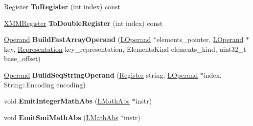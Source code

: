 \begin{DoxyCompactItemize}
\item 
\hyperlink{structv8_1_1internal_1_1_register}{Register} {\bfseries To\+Register} (int index) const \hypertarget{classv8_1_1internal_1_1_l_code_gen_ae4d98c4f4146a2d8ea844342a5bae0ea}{}\label{classv8_1_1internal_1_1_l_code_gen_ae4d98c4f4146a2d8ea844342a5bae0ea}

\item 
\hyperlink{structv8_1_1internal_1_1_double_register}{X\+M\+M\+Register} {\bfseries To\+Double\+Register} (int index) const \hypertarget{classv8_1_1internal_1_1_l_code_gen_a352c288a64a7ad764cd7521780fa6f73}{}\label{classv8_1_1internal_1_1_l_code_gen_a352c288a64a7ad764cd7521780fa6f73}

\item 
\hyperlink{classv8_1_1internal_1_1_operand}{Operand} {\bfseries Build\+Fast\+Array\+Operand} (\hyperlink{classv8_1_1internal_1_1_l_operand}{L\+Operand} $\ast$elements\+\_\+pointer, \hyperlink{classv8_1_1internal_1_1_l_operand}{L\+Operand} $\ast$key, \hyperlink{classv8_1_1internal_1_1_representation}{Representation} key\+\_\+representation, Elements\+Kind elements\+\_\+kind, uint32\+\_\+t base\+\_\+offset)\hypertarget{classv8_1_1internal_1_1_l_code_gen_a96354b52eae3401a603556c6e11b44aa}{}\label{classv8_1_1internal_1_1_l_code_gen_a96354b52eae3401a603556c6e11b44aa}

\item 
\hyperlink{classv8_1_1internal_1_1_operand}{Operand} {\bfseries Build\+Seq\+String\+Operand} (\hyperlink{structv8_1_1internal_1_1_register}{Register} string, \hyperlink{classv8_1_1internal_1_1_l_operand}{L\+Operand} $\ast$index, String\+::\+Encoding encoding)\hypertarget{classv8_1_1internal_1_1_l_code_gen_a267f61edcc17719d1bbbecda994bc6c2}{}\label{classv8_1_1internal_1_1_l_code_gen_a267f61edcc17719d1bbbecda994bc6c2}

\item 
void {\bfseries Emit\+Integer\+Math\+Abs} (\hyperlink{classv8_1_1internal_1_1_l_math_abs}{L\+Math\+Abs} $\ast$instr)\hypertarget{classv8_1_1internal_1_1_l_code_gen_a47f49c0b36ce0adea0f302d6d3e44716}{}\label{classv8_1_1internal_1_1_l_code_gen_a47f49c0b36ce0adea0f302d6d3e44716}

\item 
void {\bfseries Emit\+Smi\+Math\+Abs} (\hyperlink{classv8_1_1internal_1_1_l_math_abs}{L\+Math\+Abs} $\ast$instr)\hypertarget{classv8_1_1internal_1_1_l_code_gen_afe785346e42959a185e1f17d3620c595}{}\label{classv8_1_1internal_1_1_l_code_gen_afe785346e42959a185e1f17d3620c595}


\end{DoxyCompactItemize}
